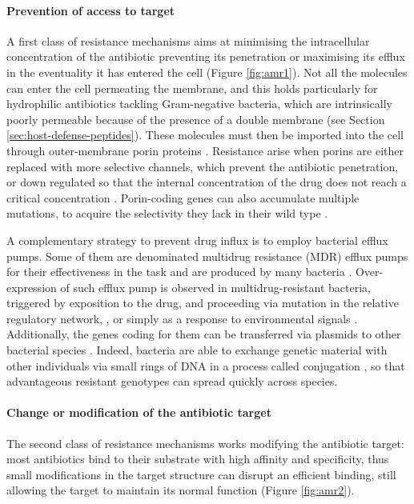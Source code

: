 \paragraph{Prevention of access to target}
A first class of resistance mechanisms aims at minimising the intracellular concentration of the antibiotic preventing its penetration or maximising its efflux in the eventuality it has entered the cell (Figure \ref{fig:amr1}).
%
Not all the molecules can enter the cell permeating the membrane, and this holds particularly for hydrophilic antibiotics tackling Gram-negative bacteria, which are intrinsically poorly permeable because of the presence of a double membrane \citep{Delcour2009} (see Section \ref{sec:host-defense-peptides}).
%
These molecules must then be imported into the cell through outer-membrane porin proteins \citep{Vargiu2012,Kojima2013}. Resistance arise when porins are either replaced with more selective channels, which prevent the antibiotic penetration, or down regulated so that the internal concentration of the drug does not reach a critical concentration \citep{Lavigne2013}. Porin-coding genes can also accumulate multiple mutations, to acquire the selectivity they lack in their wild type \citep{Poulou2013}.

A complementary strategy to prevent drug influx is to employ bacterial efflux pumps. Some of them are denominated multidrug resistance (MDR) efflux pumps for their effectiveness in the task and are produced by many bacteria \citep{Floyd2010,Ogawa2012}.
%
Over-expression of such efflux pump is observed in multidrug-resistant bacteria, triggered by exposition to the drug, and proceeding via mutation in the relative regulatory network, \citep{Abouzeed2008}, or simply as a response to environmental signals \citep{Nikaido2011}.
%
Additionally, the genes coding for them can be transferred via plasmids to other bacterial species \citep{Dolejska2013}. Indeed, bacteria are able to exchange genetic material with other individuals via small rings of DNA in a process called conjugation \citep{Sorensen2005}, so that advantageous resistant genotypes can spread quickly across species.


\paragraph{Change or modification of the antibiotic target}
The second class of resistance mechanisms works modifying the antibiotic target: most antibiotics bind to their substrate with high affinity and specificity, thus small modifications in the target structure can disrupt an efficient binding, still allowing the target to maintain its normal function (Figure \ref{fig:amr2}).

